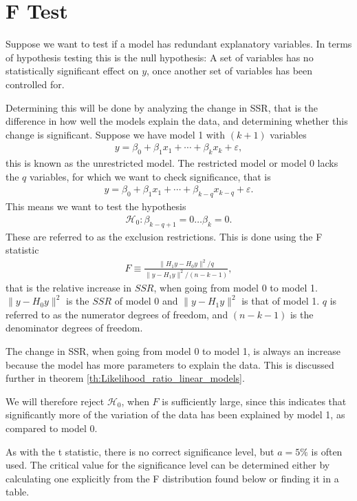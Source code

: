 \section{F Test}

Suppose we want to test if a model has redundant explanatory variables.
In terms of hypothesis testing this is the null hypothesis: A set of variables has no statistically significant effect on $y$, once another set of variables has been controlled for. 

Determining this will be done by analyzing the change in SSR, that is the difference in how well the models explain the data, and determining whether this change is significant. 
Suppose we have model 1 with $(k+1)$ variables 
\begin{align*}
    y = \beta_0 + \beta_1 x_1 + \cdots + \beta_k x_k + \varepsilon,
\end{align*}
this is known as the unrestricted model. The restricted model or model 0 lacks the $q$ variables, for which we want to check significance, that is
\begin{align*}
    y = \beta_0 + \beta_1 x_1 + \cdots + \beta_{k-q} x_{k-q} + \varepsilon.
\end{align*}
This means we want to test the hypothesis
\begin{align}
    \mathcal{H}_0: \beta_{k-q+1} = 0 \ldots \beta_k = 0.
\end{align}
These are referred to as the exclusion restrictions. 
This is done using the F statistic
\begin{align}\label{eq:F_test}
    F \equiv \frac{\| H_1 y - H_0 y \|^2/q}{\| y - H_1 y \|^2/(n-k-1)},
\end{align}
that is the relative increase in $SSR$, when going from model 0 to model 1. 
$\| y - H_0 y \|^2$ is the $SSR$ of model 0 and $\| y - H_1 y \|^2$ is that of model 1. 
$q$ is referred to as the numerator degrees of freedom, and $(n-k-1)$ is the denominator degrees of freedom. 

The change in SSR, when going from model 0 to model 1, is always an increase because the model has more parameters to explain the data. 
This is discussed further in theorem \ref{th:Likelihood_ratio_linear_models}.

We will therefore reject $\mathcal{H}_0$, when $F$ is sufficiently large, since this indicates that significantly more of the variation of the data has been explained by model 1, as compared to model 0.

As with the t statistic, there is no correct significance level, but $a = 5 \%$ is often used. 
The critical value for the significance level can be determined either by calculating one explicitly from the F distribution found below or finding it in a table. 

